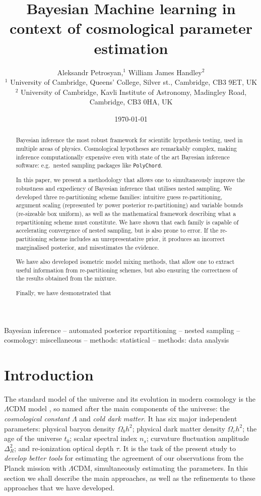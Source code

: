 \documentclass[usenatbib]{mnras}
\author[A. Petrosyan and W. J. Handley]{
  Aleksandr Petrosyan,$^{1}$
  William James Handley$^{2}$
  \\
  $^{1}$ University of Cambridge, Queens' College, Silver st., Cambridge, CB3 9ET, UK\\
  $^{2}$ University of Cambridge, Kavli Institute of Astronomy, Madingley Road, Cambridge, CB3 0HA, UK 
}
\date{\today}
\title[Accelerated Bayesian inference]{Bayesian Machine learning in context of cosmological parameter estimation}
\begin{document}
\maketitle
\begin{abstract}
  Bayesian inference the most robust framework for scientific
  hypothesis testing, used in multiple areas of physics. Cosmological
  hypotheses are remarkably complex, making inference computationally
  expensive even with state of the art Bayesian inference software:
  e.g.~nested sampling packages like \texttt{PolyChord}.

  In this paper, we present a methodology that allows one to
  simultaneously improve the robustness and expediency of Bayesian
  inference that utilises nested sampling. We developed three
  re-partitioning scheme families: intuitive guess re-partitioning,
  argument scaling (represented by power posterior re-partitioning)
  and variable bounds (re-sizeable box uniform), as well as the
  mathematical framework describing what a repartitioning scheme must
  constitute. We have shown that each family is capable of
  accelerating convergence of nested sampling, but is also prone to
  error. If the re-partitioning scheme includes an unrepresentative
  prior, it produces an incorrect marginalised posterior, and
  misestimates the evidence.

  We have also developed isometric model mixing methods, that allow
  one to extract useful information from re-partitioning schemes, but
  also ensuring the correctness of the results obtained from the
  mixture.

  Finally, we have desmonstrated that 
\end{abstract}

\begin{keywords}
Bayesian inference -- automated posterior repartitioning -- nested sampling -- cosmology: miscellaneous -- methods: statistical -- methods: data analysis
\end{keywords}

\section{Introduction}\label{sec:org14413d7}

The standard model of the universe and its evolution in modern
cosmology is the \(\Lambda\)CDM model \citep{Condon2018}, so named
after the main components of the universe: the \emph{cosmological constant} \(\Lambda\)
and \emph{cold dark matter}. It has six major independent parameters:
physical baryon density \(\Omega_{b}h^{2}\); physical dark matter
density \(\Omega_{c}h^{2}\); the age of the universe \(t_{0}\); scalar
spectral index \(n_{s}\); curvature fluctuation amplitude
\(\Delta_{R}^{2}\); and re-ionization optical depth \(\tau\). It is the
task of the present study to \emph{develop better tools} for estimating
the agreement of our observations from the Planck mission with
\(\Lambda\)CDM, simultaneously estimating the parameters. In this
section we shall describe the main approaches, as well as the
refinements to these approaches that we have developed.
\end{document}
